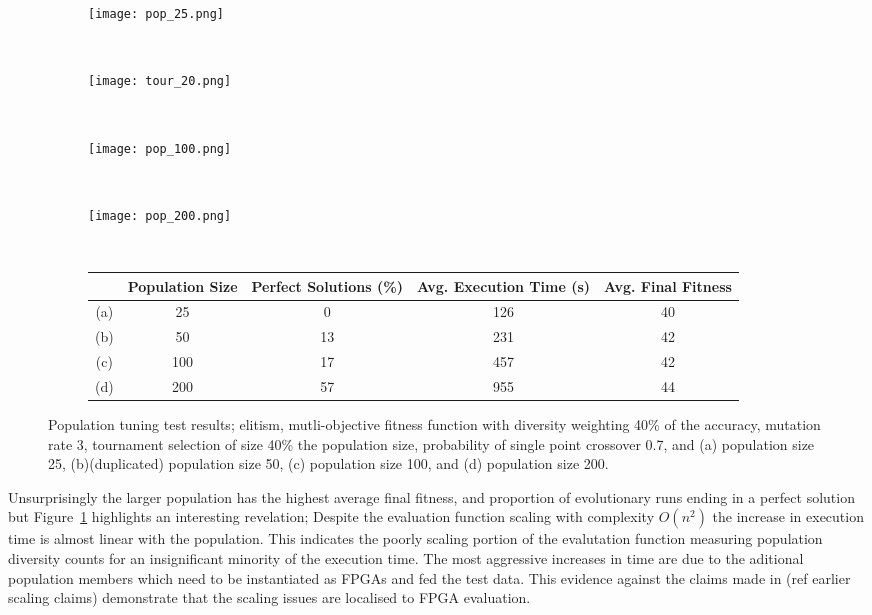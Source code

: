 \begin{figure}
	\centering
	\begin{subfigure}[ht]{0.49\textwidth}
		\texttt{[image: pop\_25.png]}
		\caption{}
		\vspace{1em}
	\end{subfigure}
	~
	\begin{subfigure}[ht]{0.49\textwidth}
		\texttt{[image: tour\_20.png]}
		\caption{}
		\vspace{1em}
	\end{subfigure}
	~
	\begin{subfigure}[ht]{0.49\textwidth}
		\texttt{[image: pop\_100.png]}
		\caption{}
		\vspace{1em}
	\end{subfigure}
	~
	\begin{subfigure}[ht]{0.49\textwidth}
		\texttt{[image: pop\_200.png]}
		\caption{}
		\vspace{1em}
	\end{subfigure}
	~
	\begin{subfigure}[ht]{\textwidth}
		\centering
		\begin{tabular}{ccccc}
			\toprule
			& \bfseries{Population Size} &
			\bfseries{Perfect Solutions (\%)} &
			\bfseries{Avg. Execution Time (s)} & \bfseries{Avg. Final Fitness}\\
			\midrule
			(a) & 25 & 0 & 126 & 40\\
			(b) & 50 & 13 & 231 & 42\\
			(c) & 100 & 17 & 457 & 42\\
			(d) & 200 & 57 & 955 & 44\\
			\bottomrule
		\end{tabular}
	\end{subfigure}

	\caption[Population tuning test results]{Population tuning test results;
	elitism, mutli-objective fitness function with diversity weighting 40\%
	of the accuracy, mutation rate 3, tournament selection of size 40\%
	the population size, probability of single point crossover 0.7, and
	(a) population size 25, (b)(duplicated) population size 50, (c) population size 100,
	and (d) population size 200.}
	\label{fig:pop}
\end{figure}

Unsurprisingly the larger population has the highest average final fitness,
and proportion of evolutionary runs ending in a perfect solution but
Figure~\ref{fig:pop} highlights an interesting revelation; Despite the evaluation
function scaling with complexity $O(n^2)$ the increase in execution time is
almost linear with the population. This indicates the poorly scaling portion of
the evalutation function measuring population diversity counts for an insignificant
minority of the execution time. The most aggressive increases in time are due to
the aditional population members which need to be instantiated as FPGAs and
fed the test data. This evidence against the claims made in (\todo ref earlier scaling
claims) demonstrate that the scaling issues are localised to FPGA evaluation.

